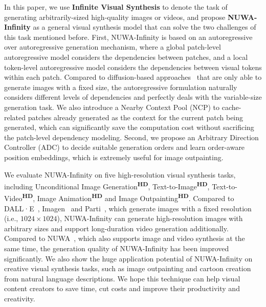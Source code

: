 \documentclass{article}
\begin{document}
In this paper, we use \textbf{Infinite Visual Synthesis} to denote the task of generating arbitrarily-sized high-quality images or videos, and propose \textbf{NUWA-Infinity} as a general visual synthesis model that can solve the two challenges of this task mentioned before. First, NUWA-Infinity is based on an autoregressive over autoregressive generation mechanism, where a global patch-level autoregressive model considers the dependencies between patches, and a local token-level autoregressive model considers the dependencies between visual tokens within each patch. Compared to diffusion-based approaches~\cite{dhariwalDiffusionModelsBeat2021,hoDenoisingDiffusionProbabilistic2020,guVectorQuantizedDiffusion2022} that are only able to generate images with a fixed size, the autoregressive formulation naturally considers different levels of dependencies and perfectly deals with the variable-size generation task. We also introduce a Nearby Context Pool (NCP) to cache-related patches already generated as the context for the current patch being generated, which can significantly save the computation cost without sacrificing the patch-level dependency modeling. Second, we propose an Arbitrary Direction Controller (ADC) to decide suitable generation orders and learn order-aware position embeddings, which is extremely useful for image outpainting.

We evaluate NUWA-Infinity on five high-resolution visual synthesis tasks, including Unconditional Image Generation\textsuperscript{\textbf{HD}}, Text-to-Image\textsuperscript{\textbf{HD}}, Text-to-Video\textsuperscript{\textbf{HD}}, Image Animation\textsuperscript{\textbf{HD}} and Image Outpainting\textsuperscript{\textbf{HD}}. Compared to DALL·E~\cite{rameshZeroShotTexttoImageGeneration2021}, Imagen~\cite{sahariaPhotorealisticTexttoImageDiffusion2022} and Parti~\cite{yuScalingAutoregressiveModels2022}, which generate images with a fixed resolution (i.e., $1024\times1024$), NUWA-Infinity can generate high-resolution images with arbitrary sizes and support long-duration video generation additionally. Compared to NUWA~\cite{wuUWAVisualSynthesis2022}, which also supports image and video synthesis at the same time, the generation quality of NUWA-Infinity has been improved significantly. We also show the huge application potential of NUWA-Infinity on creative visual synthesis tasks, such as image outpainting and cartoon creation from natural language descriptions. We hope this technique can help visual content creators to save time, cut costs and improve their productivity and creativity.
\end{document}
